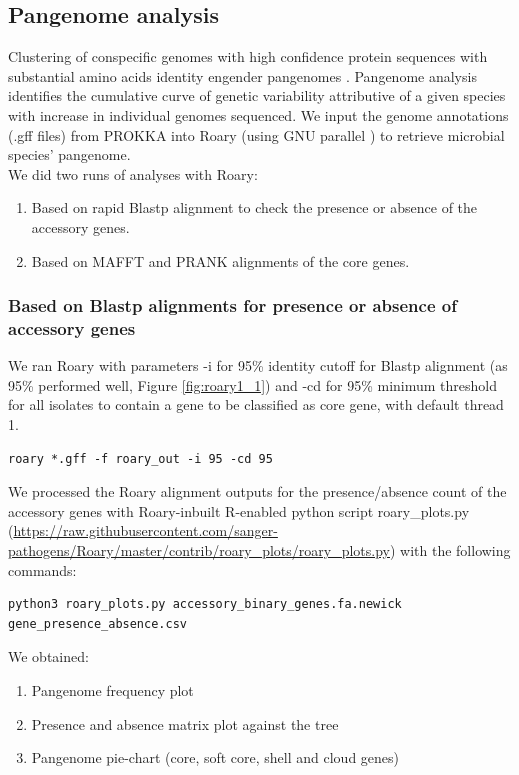 \documentclass[11pt]{article}
\begin{document}
\subsection{Pangenome analysis}
Clustering of conspecific genomes with high confidence protein sequences with substantial amino acids identity engender pangenomes \cite{Almeida2019}. Pangenome analysis identifies the cumulative curve of genetic variability attributive of a given species with increase in individual genomes sequenced\cite{Muzzi2011,Nguyen2015}. We input the genome annotations (.gff files) from PROKKA into Roary\cite{Page2015} (using GNU parallel \cite{tange_2022_6213471}) to retrieve microbial species' pangenome.\\
We did two runs of analyses with Roary:
\begin{enumerate}
\item Based on rapid Blastp alignment to check the presence or absence of the accessory genes.
\item Based on MAFFT\cite{Katoh2002} and PRANK\cite{Lytynoja2013} alignments of the core genes.
\end{enumerate}

\subsubsection{Based on Blastp alignments for presence or absence of accessory genes}
We ran Roary with parameters -i for 95\% identity cutoff for Blastp alignment (as 95\% performed well, Figure \ref{fig:roary1_1}) and -cd for 95\% minimum threshold for all isolates to contain a gene to be classified as core gene, with default thread 1.
\begin{lstlisting}
roary *.gff -f roary_out -i 95 -cd 95
\end{lstlisting}

We processed the Roary alignment outputs for the presence/absence count of the accessory genes with Roary-inbuilt R-enabled python script roary\_plots.py (\url{https://raw.githubusercontent.com/sanger-pathogens/Roary/master/contrib/roary_plots/roary_plots.py})
with the following commands:
\begin{lstlisting} 
python3 roary_plots.py accessory_binary_genes.fa.newick gene_presence_absence.csv
\end{lstlisting}
We obtained:
\begin{enumerate}
\item Pangenome frequency plot
\item Presence and absence matrix plot against the tree
\item Pangenome pie-chart (core, soft core, shell and cloud genes)
\end{enumerate}
\end{document}
